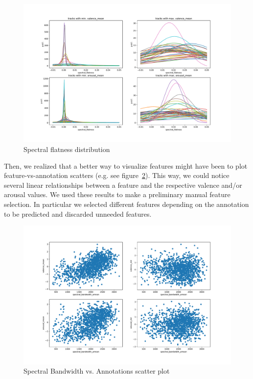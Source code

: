 \begin{figure}
	\centering
	\includegraphics[width=\linewidth]{assets/va_mean-spectral_flatness-dists.pdf}
	\caption{Spectral flatness distribution}
	\label{fig:va_mean-spectral_flatness-dists}
\end{figure}

Then, we realized that a better way to visualize features might have been to plot feature-vs-annotation scatters (e.g. see figure~\ref{fig:scatter-spectral_bandwidth_amean}). This way, we could notice several linear relationships between a feature and the respective valence and/or arousal values. We used these results to make a preliminary manual feature selection. In particular we selected different features depending on the annotation to be predicted and discarded unneeded features.

\begin{figure}
	\centering
	\includegraphics[width=\linewidth]{assets/scatter-spectral_bandwidth_amean.pdf}
	\caption{Spectral Bandwidth vs. Annotations scatter plot}
	\label{fig:scatter-spectral_bandwidth_amean}
\end{figure}

